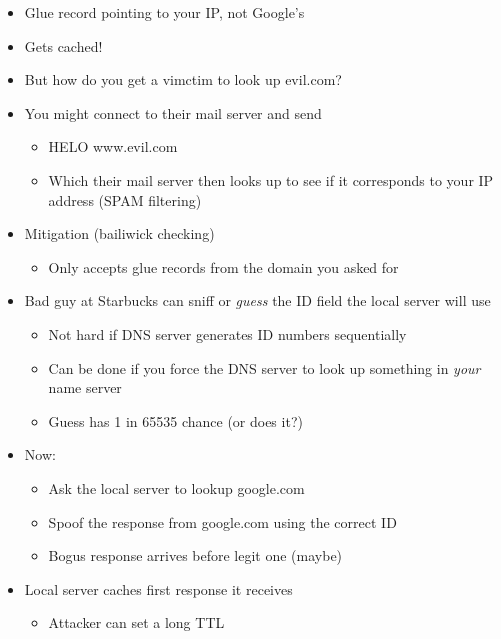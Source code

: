 \begin{itemize}[nosep]
\begin{Verbatim}[commandchars=\\\{\}]
              ;; ADDITIONAL SECTION:
              \textcolor{red}{google.com.               5     IN     A    212.44.9.155}
          \end{Verbatim}
    \item Glue record pointing to your IP, not Google's
    \item Gets cached!
    \item But how do you get a vimctim to look up evil.com?
    \item You might connect to their mail server and send
          \begin{itemize}[nosep]
              \item HELO www.evil.com
              \item Which their mail server then looks up to see if it corresponds to your IP address (SPAM filtering)
          \end{itemize}
    \item Mitigation (bailiwick checking)
          \begin{itemize}[nosep]
              \item Only accepts glue records from the domain you asked for
          \end{itemize}
    \item Bad guy at Starbucks can sniff or \emph{guess} the ID field the local server will use
          \begin{itemize}[nosep]
              \item Not hard if DNS server generates ID numbers sequentially
              \item Can be done if you force the DNS server to look up something in \emph{your} name server
              \item Guess has 1 in 65535 chance (or does it?)
          \end{itemize}
    \item Now:
          \begin{itemize}[nosep]
              \item Ask the local server to lookup google.com
              \item Spoof the response from google.com using the correct ID
              \item Bogus response arrives before legit one (maybe)
          \end{itemize}
    \item Local server caches first response it receives
          \begin{itemize}[nosep]
              \item Attacker can set a long TTL
          \end{itemize}
\end{itemize}
